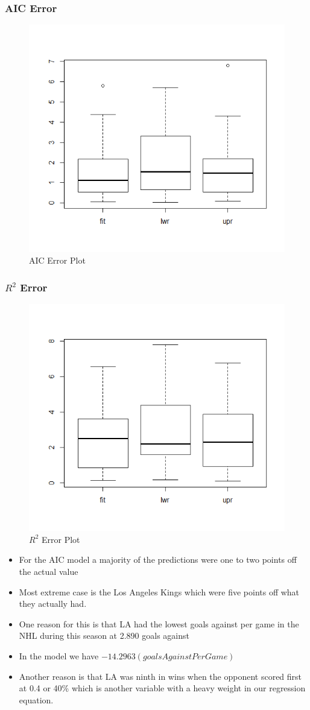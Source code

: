 \documentclass{beamer}
\begin{document}
\begin{frame}
\frametitle{AIC Error}
	\begin{figure}
		\centering
		\includegraphics[width=0.7\linewidth]{AICPredictionError}
		\caption{AIC Error Plot}
		\label{fig:aicpredictionerror}
	\end{figure}
\end{frame}
\begin{frame}
	\frametitle{$R^2$ Error}
	\begin{figure}
		\centering
		\includegraphics[width=0.7\linewidth]{RSquaredError}
		\caption{$R^2$ Error Plot}
		\label{fig:rsquarederror}
	\end{figure}
\end{frame}
\begin{frame}
	\begin{itemize}
		\item For the AIC model a majority of the predictions were one to two points off the actual value
		\item Most extreme case is the Los Angeles Kings which were five points off what they actually had. \item One reason for this is that LA had the lowest goals against per game in the NHL during this season at 2.890 goals against
		\item In the model we have $- 14.2963(goalsAgainstPerGame)$ 
		\item Another reason is that LA was ninth in wins when the opponent scored first at 0.4 or 40\% which is another variable with a heavy weight in our regression equation. 
	\end{itemize}
\end{frame}
\end{document}
